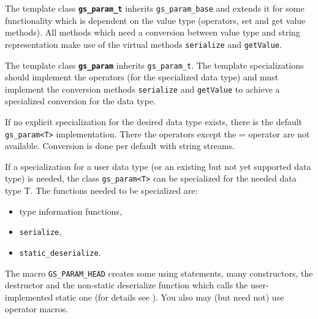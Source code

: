 The template class {\bf \lstinline|gs_param_t|} inherits \lstinline|gs_param_base| and extends it for some functionality which is dependent on the value type (operators, set and get value methods). All methods which need a conversion between value type and string representation make use of the virtual methods \lstinline|serialize| and \lstinline|getValue|.

The template class {\bf \lstinline|gs_param|} inherits \lstinline|gs_param_t|. The template specializations should implement the operators (for the specialized data type) and must implement the conversion methods \lstinline|serialize| and \lstinline|getValue| to achieve a specialized conversion for the data type.

If no explicit specialization for the desired data type exists, there is the default \lstinline|gs_param<T>| implementation. There the operators except the = operator are not available. Conversion is done per default with string streams.

If a specialization for a user data type (or an existing but not yet supported data type) is needed, the class
\mbox{\lstinline|gs_param<T>|} can be specialized for the needed data type T. The functions needed
to be specialized are: 
\begin{itemize}
  \item type information functions, 
  \item \lstinline|serialize|, 
  \item \mbox{\lstinline|static_deserialize|.} 
\end{itemize}
The macro \lstinline|GS_PARAM_HEAD| creates some using statements, many constructors, the destructor and the non-static deserialize function which calls the user-implemented static one (for details see ). You also may (but need not) use operator macros. 

